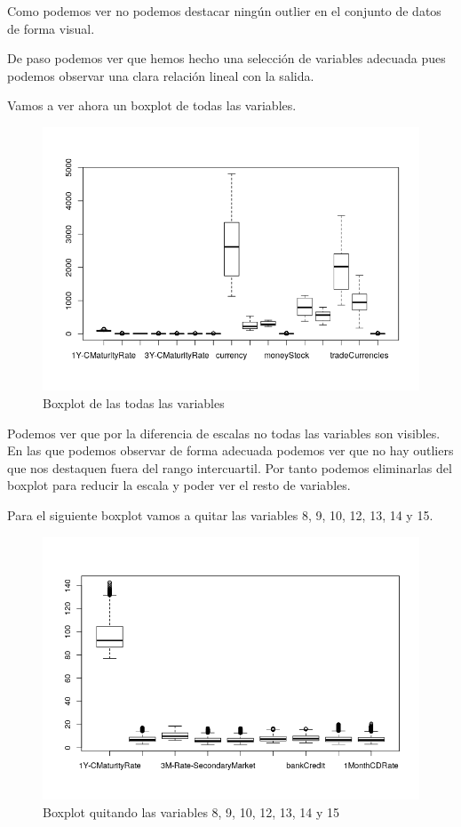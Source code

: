 \documentclass[12pt,a4paper]{article}
\begin{document}
Como podemos ver no podemos destacar ningún outlier en el conjunto de datos de forma visual.

De paso podemos ver que hemos hecho una selección de variables adecuada pues podemos observar una clara relación lineal con la salida.

Vamos a ver ahora un boxplot de todas las variables.

\begin{figure}[H]
	\centering
	\includegraphics[scale=0.8]{./Imagenes/EDA/Regresion/boxplot_todas.png}
	\caption{Boxplot de las todas las variables}
\end{figure}

Podemos ver que por la diferencia de escalas no todas las variables son visibles. En las que podemos observar de forma adecuada podemos ver que no hay outliers que nos destaquen fuera del rango intercuartil. Por tanto podemos eliminarlas del boxplot para reducir la escala y poder ver el resto de variables.

Para el siguiente boxplot vamos a quitar las variables 8, 9, 10, 12, 13, 14 y 15.

\begin{figure}[H]
	\centering
	\includegraphics[scale=0.8]{./Imagenes/EDA/Regresion/boxplot_filtrado1.png}
	\caption{Boxplot quitando las variables 8, 9, 10, 12, 13, 14 y 15}
\end{figure}
\end{document}
